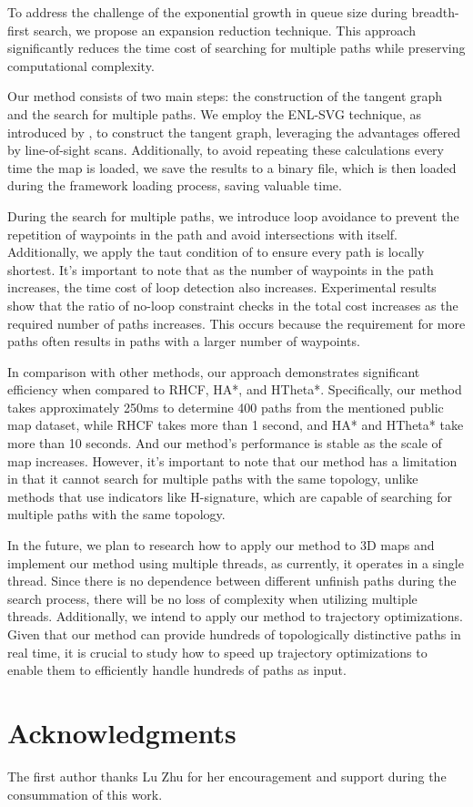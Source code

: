 \documentclass[lettersize,journal]{IEEEtran}
\begin{document}
To address the challenge of the exponential growth in queue size during breadth-first search, we propose an expansion reduction technique. This approach significantly reduces the time cost of searching for multiple paths while preserving computational complexity.

Our method consists of two main steps: the construction of the tangent graph and the search for multiple paths. We employ the ENL-SVG technique, as introduced by \cite{oh2017edge}, to construct the tangent graph, leveraging the advantages offered by line-of-sight scans. Additionally, to avoid repeating these calculations every time the map is loaded, we save the results to a binary file, which is then loaded during the framework loading process, saving valuable time.

During the search for multiple paths, we introduce loop avoidance to prevent the repetition of waypoints in the path and avoid intersections with itself. Additionally, we apply the taut condition of \cite{oh2017edge} to ensure every path is locally shortest. It's important to note that as the number of waypoints in the path increases, the time cost of loop detection also increases. Experimental results show that the ratio of no-loop constraint checks in the total cost increases as the required number of paths increases. This occurs because the requirement for more paths often results in paths with a larger number of waypoints.

In comparison with other methods, our approach demonstrates significant efficiency when compared to RHCF, HA*, and HTheta*. Specifically, our method takes approximately 250ms to determine 400 paths from the mentioned public map dataset, while RHCF takes more than 1 second, and HA* and HTheta* take more than 10 seconds. And our method's performance is stable as the scale of map increases. However, it's important to note that our method has a limitation in that it cannot search for multiple paths with the same topology, unlike methods that use indicators like H-signature, which are capable of searching for multiple paths with the same topology.

In the future, we plan to research how to apply our method to 3D maps and implement our method using multiple threads, as currently, it operates in a single thread. Since there is no dependence between different unfinish paths during the search process, there will be no loss of complexity when utilizing multiple threads. Additionally, we intend to apply our method to trajectory optimizations. Given that our method can provide hundreds of topologically distinctive paths in real time, it is crucial to study how to speed up trajectory optimizations to enable them to efficiently handle hundreds of paths as input.


\section*{Acknowledgments}
The first author thanks Lu Zhu for her encouragement and support during the consummation of this work.

\normalem
\printbibliography
\end{document}
